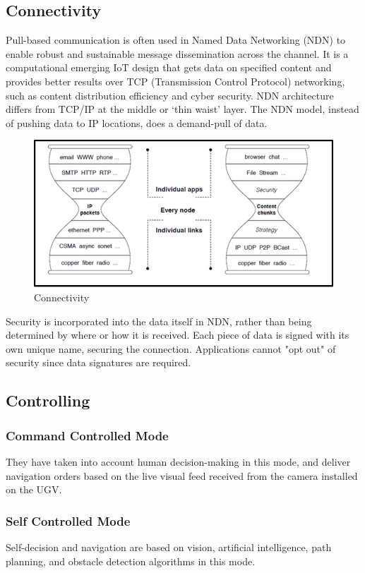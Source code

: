 \documentclass[conference,a4paper]{IEEEtran}
\begin{document}
\subsection{Connectivity}
Pull-based communication is often used in Named Data Networking (NDN) to enable robust and sustainable message dissemination across the channel. It is a computational emerging IoT design that gets data on specified content and provides better results over TCP (Transmission Control Protocol) networking, such as content distribution efficiency and cyber security. NDN architecture differs from TCP/IP at the middle or ‘thin waist’ layer. The NDN model, instead of pushing data to IP locations, does a demand-pull of data. \cite{1}
\begin{figure}[ht]
\centering
\includegraphics[width=1\linewidth]{IoT2.jpg}
\caption{Connectivity}
\label{Fig: IoT3}
\end{figure}

Security is incorporated into the data itself in NDN, rather than being determined by where or how it is received. Each piece of data is signed with its own unique name, securing the connection. Applications cannot "opt out" of security since data signatures are required.\cite{11}

\subsection{Controlling}
\subsubsection{Command Controlled Mode}
They have taken into account human decision-making in this mode, and deliver navigation orders based on the live visual feed received from the camera installed on the UGV.\cite{9}
\subsubsection{Self Controlled Mode}
Self-decision and navigation are based on vision, artificial intelligence, path planning, and obstacle detection algorithms in this mode. \cite{9}
\end{document}
